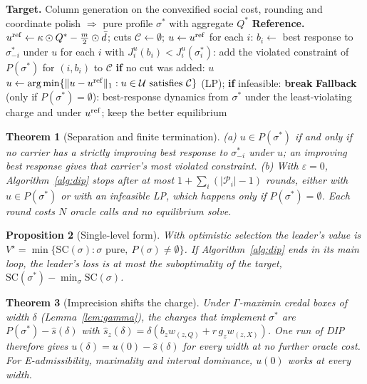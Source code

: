 \documentclass[preprint,11pt]{elsarticle}
\newtheorem{theorem}{Theorem}
\newtheorem{proposition}[theorem]{Proposition}
\theoremstyle{definition}
\theoremstyle{remark}
\begin{document}
\begin{algorithm}[t]
\caption{DIP: dual implementation pricing}\label{alg:dip}
\begin{algorithmic}[1]
\State \textbf{Target.} Column generation on the convexified social cost, rounding and coordinate polish $\Rightarrow$ pure profile $\sigma^*$ with aggregate $Q^*$
\State \textbf{Reference.} $u^{\rm ref}\gets\kappa\odot Q^*-\tfrac m2\odot\bar d$; cuts $\mathcal C\gets\emptyset$; $u\gets u^{\rm ref}$
\Repeat
  \State for each $i$: $b_i\gets$ best response to $\sigma^*_{-i}$ under $u$ 
  \State for each $i$ with $J^u_i(b_i)<J^u_i(\sigma^*_i)$: add the violated constraint of $P(\sigma^*)$ for $(i,b_i)$ to $\mathcal C$
  \State \textbf{if} no cut was added: \Return $u$ 
  \State $u\gets\arg\min\{\|u-u^{\rm ref}\|_1:u\in\mathcal U\text{ satisfies }\mathcal C\}$ (LP); \textbf{if} infeasible: \textbf{break}
\Until{}
\State \textbf{Fallback} (only if $P(\sigma^*)=\emptyset$): best-response dynamics from $\sigma^*$ under the least-violating charge and under $u^{\rm ref}$; keep the better equilibrium
\end{algorithmic}
\end{algorithm}

\begin{theorem}[Separation and finite termination]\label{thm:cut}
(a) $u\in P(\sigma^*)$ if and only if no carrier has a strictly improving best response to $\sigma^*_{-i}$ under $u$; an improving best response gives that carrier's most violated constraint. (b) With $\varepsilon=0$, Algorithm~\ref{alg:dip} stops after at most $1+\sum_i(|\mathcal P_i|-1)$ rounds, either with $u\in P(\sigma^*)$ or with an infeasible LP, which happens only if $P(\sigma^*)=\emptyset$. Each round costs $N$ oracle calls and no equilibrium solve.
\end{theorem}

\begin{proposition}[Single-level form]\label{prop:opt}
With optimistic selection the leader's value is $V^\star=\min\{\mathrm{SC}(\sigma):\sigma\text{ pure},\ P(\sigma)\ne\emptyset\}$. If Algorithm~\ref{alg:dip} ends in its main loop, the leader's loss is at most the suboptimality of the target, $\mathrm{SC}(\sigma^*)-\min_\sigma\mathrm{SC}(\sigma)$.
\end{proposition}

\begin{theorem}[Imprecision shifts the charge]\label{thm:credal}
Under $\Gamma$-maximin credal boxes of width $\delta$ (Lemma~\ref{lem:gamma}), the charges that implement $\sigma^*$ are $P(\sigma^*)-\hat s(\delta)$ with $\hat s_z(\delta)=\delta(b_zw_{(z,Q)}+r\,g_zw_{(z,X)})$. One run of DIP therefore gives $u(\delta)=u(0)-\hat s(\delta)$ for every width at no further oracle cost. For E-admissibility, maximality and interval dominance, $u(0)$ works at every width.
\end{theorem}
\end{document}
